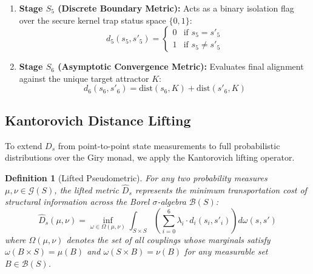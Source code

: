 \documentclass[11pt,a4paper]{article}
\newtheorem{definition}[theorem]{Definition}
\begin{document}
\begin{enumerate}
    \begin{equation}
        d_4(s_4, s'_4) = \sum_{b=1}^{256} (s_{4,b} \oplus s'_{4,b})
    \end{equation}
    \item \textbf{Stage $S_5$ (Discrete Boundary Metric):} Acts as a binary isolation flag over the secure kernel trap status space $\{0, 1\}$:
    \begin{equation}
        d_5(s_5, s'_5) = \begin{cases} 0 & \text{if } s_5 = s'_5 \\ 1 & \text{if } s_5 \neq s'_5 \end{cases}
    \end{equation}
    \item \textbf{Stage $S_6$ (Asymptotic Convergence Metric):} Evaluates final alignment against the unique target attractor $K$:
    \begin{equation}
        d_6(s_6, s'_6) = \text{dist}(s_6, K) + \text{dist}(s'_6, K)
    \end{equation}
\end{enumerate}

\subsection{Kantorovich Distance Lifting}
To extend $D_s$ from point-to-point state measurements to full probabilistic distributions over the Giry monad, we apply the Kantorovich lifting operator.

\begin{definition}[Lifted Pseudometric]
For any two probability measures $\mu, \nu \in \mathcal{G}(S)$, the lifted metric $\hat{D}_s$ represents the minimum transportation cost of structural information across the Borel $\sigma$-algebra $\mathcal{B}(S)$:
\begin{equation}
    \hat{D}_s(\mu, \nu) = \inf_{\omega \in \Omega(\mu, \nu)} \int_{S \times S} \left( \sum_{i=0}^{6} \lambda_i \cdot d_i(s_i, s'_i) \right) d\omega(s, s')
\end{equation}
where $\Omega(\mu, \nu)$ denotes the set of all couplings whose marginals satisfy $\omega(B \times S) = \mu(B)$ and $\omega(S \times B) = \nu(B)$ for any measurable set $B \in \mathcal{B}(S)$.
\end{definition}
\end{document}
